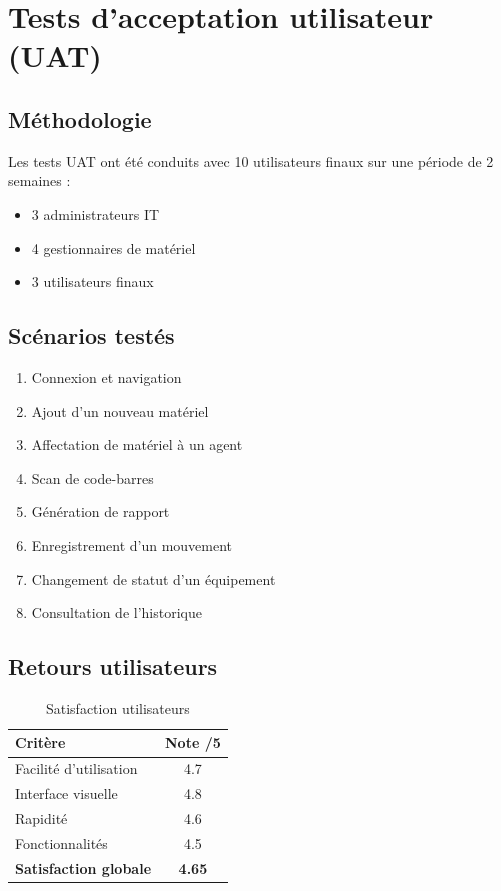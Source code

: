 \section{Tests d'acceptation utilisateur (UAT)}

\subsection{Méthodologie}

Les tests UAT ont été conduits avec 10 utilisateurs finaux sur une période de 2 semaines :

\begin{itemize}
    \item 3 administrateurs IT
    \item 4 gestionnaires de matériel
    \item 3 utilisateurs finaux
\end{itemize}

\subsection{Scénarios testés}

\begin{enumerate}
    \item Connexion et navigation
    \item Ajout d'un nouveau matériel
    \item Affectation de matériel à un agent
    \item Scan de code-barres
    \item Génération de rapport
    \item Enregistrement d'un mouvement
    \item Changement de statut d'un équipement
    \item Consultation de l'historique
\end{enumerate}

\subsection{Retours utilisateurs}

\begin{table}[H]
\centering
\caption{Satisfaction utilisateurs}
\begin{tabularx}{\textwidth}{|l|c|}
\hline
\textbf{Critère} & \textbf{Note /5} \\
\hline
Facilité d'utilisation & 4.7 \\
\hline
Interface visuelle & 4.8 \\
\hline
Rapidité & 4.6 \\
\hline
Fonctionnalités & 4.5 \\
\hline
\textbf{Satisfaction globale} & \textbf{4.65} \\
\hline
\end{tabularx}
\end{table}

